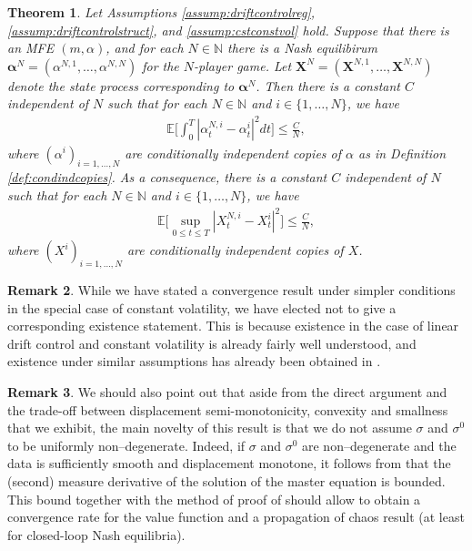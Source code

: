 \documentclass[11pt,reqno]{amsart}
\numberwithin{equation}{section}
\newtheorem{theorem}{Theorem}[section]
\theoremstyle{definition}
\newtheorem{remark}[theorem]{Remark}
\def\E{{\mathbb E}}
\def\N{{\mathbb N}}
\newcommand{\bX}{\mathbf{X}}
\def \E{\mathbb{E}}
\def \N{\mathbb{N}}
\begin{document}
\begin{theorem} \label{thm:pocdriftcontrol}
Let Assumptions \ref{assump:driftcontrolreg}, \ref{assump:driftcontrolstruct}, and \ref{assump:cstconstvol} hold. Suppose that there is an MFE $(m,\alpha)$, and for each $N \in \N$ there is a Nash equilibirum $\bm \alpha^N = (\alpha^{N,1},\dots,\alpha^{N,N})$ for the $N$-player game. Let $\bX^N = (\bX^{N,1},\dots,\bX^{N,N})$ denote the state process corresponding to $\bm \alpha^N$. Then there is a constant $C$ independent of $N$ such that for each $N \in \N$ and $i \in \{1,\dots,N\}$, we have
\begin{align} \label{mainestdrift}
\E\bigg[\int_0^T |\alpha_t^{N,i} - \alpha_t^{i}|^2 dt \bigg] \leq \frac{C}{N}, 
\end{align}
where $(\alpha^i)_{i= 1,\dots,N}$ are conditionally independent copies of $\alpha$ as in Definition \ref{def:condindcopies}.
As a consequence, there is a constant $C$ independent of $N$ such that for each $N \in \N$  and $i \in \{1,\dots,N\}$, we have 
\begin{align*}
\E\Big[\sup_{0 \leq t \leq T} |X_t^{N,i} - X_t^i|^2\Big] \leq \frac{C}{N}, 
\end{align*}
where $(X^i)_{i = 1,\dots,N}$ are conditionally independent copies of $X$.
\end{theorem}

\begin{remark}
While we have stated a convergence result under simpler conditions in the special case of constant volatility, we have elected not to give a corresponding existence statement. This is because existence in the case of linear drift control and constant volatility is already fairly well understood, and existence under similar assumptions has already been obtained in \cite{ahuja2016}.
\end{remark}

\begin{remark}
We should also point out that aside from the direct argument and the trade-off between displacement semi-monotonicity, convexity and smallness that we exhibit, the main novelty of this result is that we do not assume $\sigma$ and $\sigma^0$ to be uniformly non--degenerate.
Indeed, if $\sigma$ and $\sigma^0$ are non--degenerate and the data is sufficiently smooth and displacement monotone, it follows from \cite[Theorem 5.1]{Gang-Mes-Mou-Zhang22} that the (second) measure derivative of the solution of the master equation is bounded.
This bound together with the method of proof of \cite[Section 6.2]{cardaliaguet2019master} should allow to obtain a convergence rate for the value function and a propagation of chaos result (at least for closed-loop Nash equilibria).
\end{remark}
\end{document}
